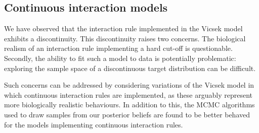 \subsection{Continuous interaction models}

We have observed that the interaction rule implemented in the Vicsek model
exhibits a discontinuity. This discontinuity raises two concerns. The
biological realism of an interaction rule implementing a hard cut-off is
questionable. Secondly, the ability to fit such a model to data is potentially
problematic: exploring the sample space of a discontinuous target distribution
can be difficult.

Such concerns can be addressed by considering variations of the Vicsek model in
which continuous interaction rules are implemented, as these arguably represent
more biologically realistic behaviours. In addition to this, the MCMC
algorithms used to draw samples from our posterior beliefs are found to be
better behaved for the models implementing continuous interaction rules.


